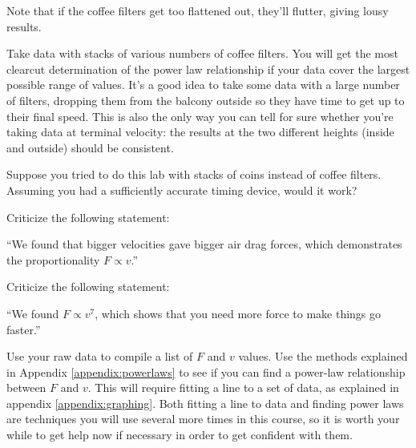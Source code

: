 Note that if the coffee filters get too flattened out,
they'll flutter, giving lousy results.

Take data with stacks of various numbers of coffee filters.
You will get the most clearcut determination of the power
law relationship if your data cover the largest possible
range of values. It's a good idea to take some data with a
large number of filters, dropping them from the balcony
outside so they have time to get up to their final speed.
This is also the only way you can tell for sure whether you're
taking data at terminal velocity: the results at the two different
heights (inside and outside) should be consistent.

\prelab

\prelabquestion Suppose you tried to do this lab with stacks of coins
instead of coffee filters. Assuming you had a sufficiently
accurate timing device, would it work?

\prelabquestion Criticize the following statement:

``We found that bigger velocities gave bigger air drag
forces, which demonstrates the proportionality $F\propto v$.''

\prelabquestion Criticize the following statement:

``We found $F\propto v^7$, which shows that you need more
force to make things go faster.''

\analysis

Use your raw data to compile a list of $F$ and $v$ values.
Use the methods explained in Appendix \ref{appendix:powerlaws} to see if you can
find a power-law relationship between $F$ and $v$. This will
require fitting a line to a set of data, as explained in
appendix \ref{appendix:graphing}. Both fitting a line to data and finding power
laws are techniques you will use several more times in this
course, so it is worth your while to get help now if
necessary in order to get confident with them.
